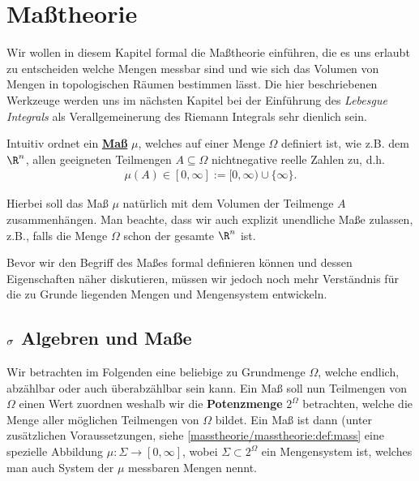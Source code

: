 \documentclass[letterpaper,10pt,german]{jupyterBook}
\begin{document}
\section{Maßtheorie}
\label{\detokenize{masstheorie/masstheorie:masztheorie}}\label{\detokenize{masstheorie/masstheorie::doc}}
\par
Wir wollen in diesem Kapitel formal die Maßtheorie einführen, die es uns erlaubt zu entscheiden welche Mengen messbar sind und wie sich das Volumen von Mengen in topologischen Räumen bestimmen lässt.
Die hier beschriebenen Werkzeuge werden uns im nächsten Kapitel bei der Einführung des \emph{Lebesgue Integrals} als Verallgemeinerung des Riemann Integrals sehr dienlich sein.

\par
Intuitiv ordnet ein \href{https://de.wikipedia.org/wiki/Ma\%c3\%9f\_(Mathematik)}{\textbf{Maß}} \(\mu\), welches auf einer Menge \(\Omega\) definiert ist, wie z.B. dem \(\R^n\), allen geeigneten Teilmengen \(A\subseteq \Omega\) nichtnegative reelle Zahlen zu, d.h.
\begin{align*}
\mu(A)\in[0,\infty] := [0,\infty)\cup\{\infty\}.
\end{align*}
\par
Hierbei soll das Maß \(\mu\) natürlich mit dem Volumen der Teilmenge \(A\) zusammenhängen.
Man beachte, dass wir auch explizit unendliche Maße zulassen, z.B., falls die Menge \(\Omega\) schon der gesamte \(\R^n\) ist.

\par
Bevor wir den Begriff des Maßes formal definieren können und dessen Eigenschaften näher diskutieren, müssen wir jedoch noch mehr Verständnis für die zu Grunde liegenden Mengen und Mengensystem entwickeln.


\subsection{\protect\(\sigma\protect\) Algebren und Maße}
\label{\detokenize{masstheorie/masstheorie:sigma-algebren-und-masze}}\label{\detokenize{masstheorie/masstheorie:s-sigmaalg}}
\par
Wir betrachten im Folgenden eine beliebige zu Grundmenge \(\Omega\), welche endlich, abzählbar oder auch überabzählbar sein kann. Ein Maß soll nun Teilmengen von \(\Omega\) einen Wert zuordnen weshalb wir die \textbf{Potenzmenge} \(2^\Omega\) betrachten, welche die Menge aller möglichen Teilmengen von \(\Omega\) bildet. Ein Maß ist dann (unter zusätzlichen Voraussetzungen, siehe \cref{masstheorie/masstheorie:def:mass}  eine spezielle Abbildung \(\mu:\Sigma\to[0,\infty]\), wobei \(\Sigma\subset 2^\Omega\) ein Mengensystem ist, welches man auch System der \(\mu\) messbaren Mengen nennt.
\end{document}
